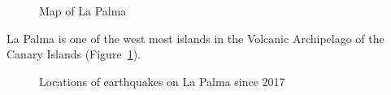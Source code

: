 \documentclass[
]{agujournal2019}
\begin{document}
\begin{figure}


\caption{\label{fig-map}Map of La Palma}

\end{figure}%

La Palma is one of the west most islands in the Volcanic Archipelago of
the Canary Islands (Figure~\ref{fig-map}).

\begin{figure}[H]


\caption{\label{fig-spatial-plot}Locations of earthquakes on La Palma
since 2017}

\end{figure}%
\end{document}
